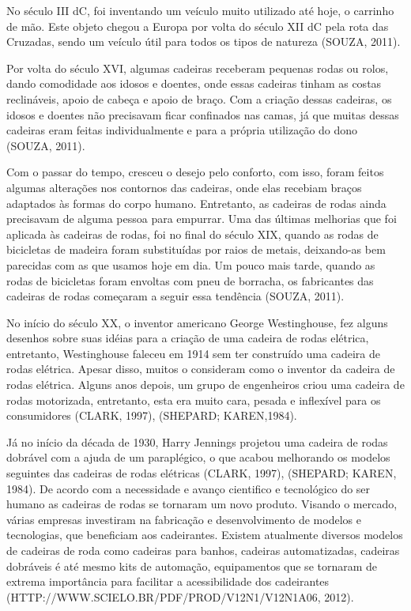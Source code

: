 No século III dC, foi inventando um veículo muito utilizado até hoje, o carrinho de mão. Este objeto chegou a Europa por volta do século XII dC pela rota das Cruzadas, sendo um veículo útil para todos os tipos de natureza (SOUZA, 2011).

Por volta do século XVI, algumas cadeiras receberam pequenas rodas ou rolos, dando comodidade aos idosos e doentes, onde essas cadeiras tinham as costas reclináveis, apoio de cabeça e apoio de braço. Com a criação dessas cadeiras, os idosos e doentes não precisavam ficar confinados nas camas, já que muitas dessas cadeiras eram feitas individualmente e para a própria utilização do dono (SOUZA, 2011).

Com o passar do tempo, cresceu o desejo pelo conforto, com isso, foram feitos algumas alterações nos contornos das cadeiras, onde elas recebiam braços adaptados às formas do corpo humano. Entretanto, as cadeiras de rodas ainda precisavam de alguma pessoa para empurrar. Uma das últimas melhorias que foi aplicada às cadeiras de rodas, foi no final do século XIX, quando as rodas de bicicletas de madeira foram substituídas por raios de metais, deixando-as bem parecidas com as que usamos hoje em dia. Um pouco mais tarde, quando as rodas de bicicletas foram envoltas com pneu de borracha, os fabricantes das cadeiras de rodas começaram a seguir essa tendência (SOUZA, 2011).

No início do século XX, o inventor americano George Westinghouse, fez alguns desenhos sobre suas idéias para a criação de uma cadeira de rodas elétrica, entretanto, Westinghouse faleceu em 1914 sem ter construído uma cadeira de rodas elétrica. Apesar disso, muitos o consideram como o inventor da cadeira de rodas elétrica. Alguns anos depois, um grupo de engenheiros criou uma cadeira de rodas motorizada, entretanto, esta era muito cara, pesada e inflexível para os consumidores (CLARK, 1997), (SHEPARD; KAREN,1984).

Já no início da década de 1930, Harry Jennings projetou uma cadeira de rodas dobrável com a ajuda de um paraplégico, o que acabou melhorando os modelos seguintes das cadeiras de rodas elétricas (CLARK, 1997), (SHEPARD; KAREN, 1984).
De acordo com a necessidade e avanço cientifico e tecnológico do ser humano as cadeiras de rodas se tornaram um novo produto. Visando o mercado, várias empresas investiram na fabricação e desenvolvimento de modelos e tecnologias, que beneficiam aos cadeirantes. Existem atualmente diversos modelos de cadeiras de roda como cadeiras para banhos, cadeiras automatizadas, cadeiras dobráveis é até mesmo kits de automação, equipamentos que se tornaram de extrema importância para facilitar a acessibilidade dos cadeirantes (HTTP://WWW.SCIELO.BR/PDF/PROD/V12N1/V12N1A06, 2012).

